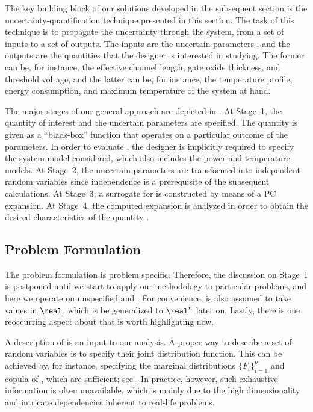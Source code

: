 The key building block of our solutions developed in the subsequent section is
the uncertainty-quantification technique presented in this section. The task of
this technique is to propagate the uncertainty through the system, from a set of
inputs to a set of outputs. The inputs are the uncertain parameters \vu, and the
outputs are the quantities that the designer is interested in studying. The
former can be, for instance, the effective channel length, gate oxide thickness,
and threshold voltage, and the latter can be, for instance, the temperature
profile, energy consumption, and maximum temperature of the system at hand.

The major stages of our general approach are depicted in .
At Stage~1, the quantity of interest \g and the uncertain parameters \vu are
specified. The quantity is given as a ``black-box'' function that operates on a
particular outcome of the parameters. In order to evaluate \g, the designer is
implicitly required to specify the system model considered, which also includes
the power and temperature models. At Stage~2, the uncertain parameters \vu are
transformed into independent random variables \vz since independence is a
prerequisite of the subsequent calculations. At Stage~3, a surrogate for \g is
constructed by means of a \ac{PC} expansion. At Stage~4, the computed expansion
is analyzed in order to obtain the desired characteristics of the quantity \g.

\subsection{Problem Formulation}

The problem formulation is problem specific. Therefore, the discussion on
Stage~1 is postponed until we start to apply our methodology to particular
problems, and here we operate on unspecified \g and \vu. For convenience, \g is
also assumed to take values in $\real$, which is be generalized to $\real^n$
later on. Lastly, there is one reoccurring aspect about \vu that is worth
highlighting now.

A description of \vu is an input to our analysis. A proper way to describe a set
of random variables is to specify their joint distribution function. This can be
achieved by, for instance, specifying the marginal distributions $\{ F_i \}_{i =
1}^\nu$ and copula \cite{nelsen2006} of \vu, which are sufficient; see
. In practice, however, such exhaustive information is
often unavailable, which is mainly due to the high dimensionality and intricate
dependencies inherent to real-life problems.

